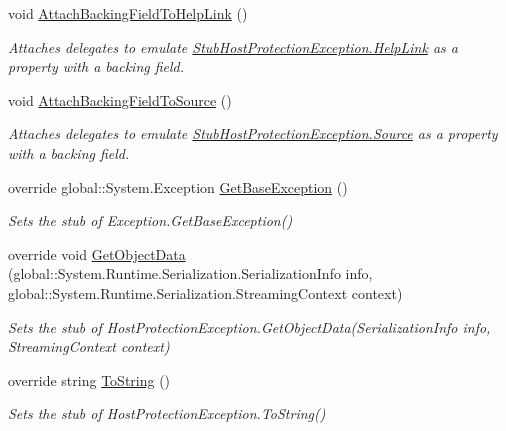\begin{DoxyCompactItemize}
void \hyperlink{class_system_1_1_security_1_1_fakes_1_1_stub_host_protection_exception_aa5a3253689316769d86f7ef48654202b}{Attach\-Backing\-Field\-To\-Help\-Link} ()
\begin{DoxyCompactList}\small\item\em Attaches delegates to emulate \hyperlink{class_system_1_1_security_1_1_fakes_1_1_stub_host_protection_exception_a9fa451cf26a24404f0ce5e1eac4b129e}{Stub\-Host\-Protection\-Exception.\-Help\-Link} as a property with a backing field.\end{DoxyCompactList}\item 
void \hyperlink{class_system_1_1_security_1_1_fakes_1_1_stub_host_protection_exception_a70b6dd5248f234ed81695d6ac71906be}{Attach\-Backing\-Field\-To\-Source} ()
\begin{DoxyCompactList}\small\item\em Attaches delegates to emulate \hyperlink{class_system_1_1_security_1_1_fakes_1_1_stub_host_protection_exception_a8e62140d1579b3f4f2a188ffd554d0bf}{Stub\-Host\-Protection\-Exception.\-Source} as a property with a backing field.\end{DoxyCompactList}\item 
override global\-::\-System.\-Exception \hyperlink{class_system_1_1_security_1_1_fakes_1_1_stub_host_protection_exception_a20129e99921ca762d232c2c2d2c598a8}{Get\-Base\-Exception} ()
\begin{DoxyCompactList}\small\item\em Sets the stub of Exception.\-Get\-Base\-Exception()\end{DoxyCompactList}\item 
override void \hyperlink{class_system_1_1_security_1_1_fakes_1_1_stub_host_protection_exception_adb85e2089a8c66eb1418b63051d91adb}{Get\-Object\-Data} (global\-::\-System.\-Runtime.\-Serialization.\-Serialization\-Info info, global\-::\-System.\-Runtime.\-Serialization.\-Streaming\-Context context)
\begin{DoxyCompactList}\small\item\em Sets the stub of Host\-Protection\-Exception.\-Get\-Object\-Data(\-Serialization\-Info info, Streaming\-Context context)\end{DoxyCompactList}\item 
override string \hyperlink{class_system_1_1_security_1_1_fakes_1_1_stub_host_protection_exception_aedd8a5af4069face5340df78756774e9}{To\-String} ()
\begin{DoxyCompactList}\small\item\em Sets the stub of Host\-Protection\-Exception.\-To\-String()\end{DoxyCompactList}\end{DoxyCompactItemize}
